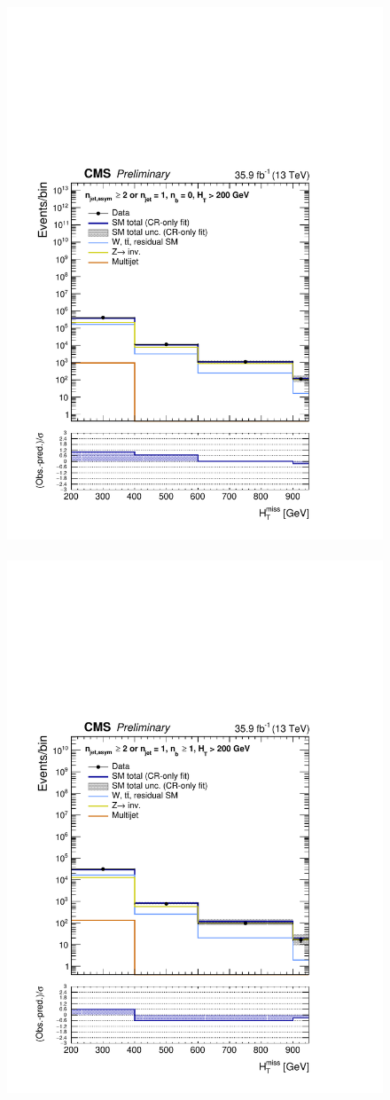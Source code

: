 \begin{figure}[h!]
  \centering
  \caption{
  }
  \includegraphics[width=0.49\linewidth]{figures/results/36invfb/aggregated/postFitShapeCR/mhtShape_eq0b_ge1j2a_200_Inf_crfit.pdf} ~
  \includegraphics[width=0.49\linewidth]{figures/results/36invfb/aggregated/postFitShapeCR/mhtShape_ge1b_ge1j2a_200_Inf_crfit.pdf} 
  \label{fig:aggregated_results1}
\end{figure}

